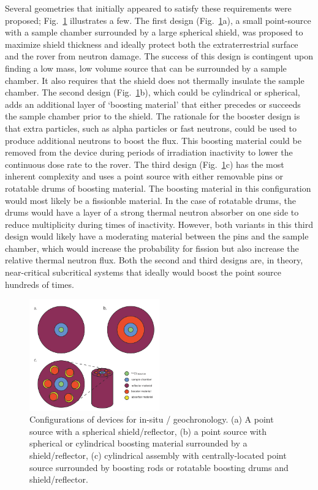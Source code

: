\documentclass{mc2015}
\begin{document}
Several geometries that initially appeared to satisfy these requirements were proposed; Fig.\ \ref{fig:geometries} illustrates a few. The first design (Fig.\ \ref{fig:geometries}a), a small point-source with a sample chamber surrounded by a large spherical shield, was proposed to maximize shield thickness and ideally protect both the extraterrestrial surface and the rover from neutron damage. The success of this design is contingent upon finding a low mass, low volume source that can be surrounded by a sample chamber. It also requires that the shield does not thermally insulate the sample chamber. The second design (Fig.\ \ref{fig:geometries}b), which could be cylindrical or spherical, adds an additional layer of `boosting material' that either precedes or succeeds the sample chamber prior to the shield. The rationale for the booster design is that extra particles, such as alpha particles or fast neutrons, could be used to produce additional neutrons to boost the flux. This boosting material could be removed from the device during periods of irradiation inactivity to lower the continuous dose rate to the rover. The third design (Fig.\ \ref{fig:geometries}c) has the most inherent complexity and uses a point source with either removable pins or rotatable drums of boosting material. The boosting material in this configuration would most likely be a fissionble material. In the case of rotatable drums, the drums would have a layer of a strong thermal neutron absorber on one side to reduce multiplicity during times of inactivity. However, both variants in this third design would likely have a moderating material between the pins and the sample chamber, which would increase the probability for fission but also increase the relative thermal neutron flux. Both the second and third designs are, in theory, near-critical subcritical systems that ideally would boost the point source hundreds of times. 

\begin{figure}
  \centering
  \includegraphics[width=0.5\textwidth]{Geometries.png}
  \caption{Configurations of devices for in-situ / geochronology. (a) A point source with a spherical shield/reflector, (b) a point source with spherical or cylindrical boosting material surrounded by a shield/reflector, (c) cylindrical assembly with centrally-located point source surrounded by boosting rods or rotatable boosting drums and shield/reflector.}
  \label{fig:geometries}
\end{figure}
\end{document}
